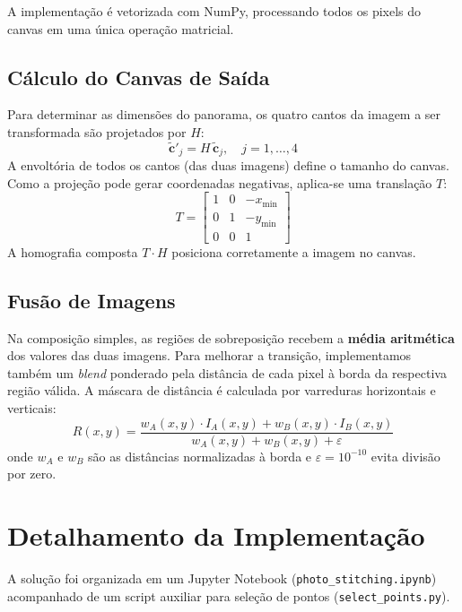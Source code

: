 \documentclass[12pt,a4paper]{article}
\begin{document}
A implementação é vetorizada com NumPy, processando todos os pixels do canvas em uma
única operação matricial.

\subsection{Cálculo do Canvas de Saída}

Para determinar as dimensões do panorama, os quatro cantos da imagem a ser
transformada são projetados por $H$:
\begin{equation}
\tilde{\mathbf{c}}'_j = H\,\tilde{\mathbf{c}}_j,\quad j=1,\ldots,4
\end{equation}
A envoltória de todos os cantos (das duas imagens) define o tamanho do canvas. Como
a projeção pode gerar coordenadas negativas, aplica-se uma translação $T$:
\begin{equation}
T = \begin{bmatrix}1&0&-x_{\min}\\0&1&-y_{\min}\\0&0&1\end{bmatrix}
\end{equation}
A homografia composta $T\cdot H$ posiciona corretamente a imagem no canvas.

\subsection{Fusão de Imagens}

Na composição simples, as regiões de sobreposição recebem a \textbf{média aritmética}
dos valores das duas imagens. Para melhorar a transição, implementamos também um
\textit{blend} ponderado pela distância de cada pixel à borda da respectiva região
válida. A máscara de distância é calculada por varreduras horizontais e verticais:
\begin{equation}
R(x,y) = \frac{w_A(x,y)\cdot I_A(x,y) + w_B(x,y)\cdot I_B(x,y)}
               {w_A(x,y) + w_B(x,y) + \varepsilon}
\end{equation}
onde $w_A$ e $w_B$ são as distâncias normalizadas à borda e $\varepsilon=10^{-10}$
evita divisão por zero.

\section{Detalhamento da Implementação}

A solução foi organizada em um Jupyter Notebook (\texttt{photo\_stitching.ipynb})
acompanhado de um script auxiliar para seleção de pontos
(\texttt{select\_points.py}).
\end{document}
